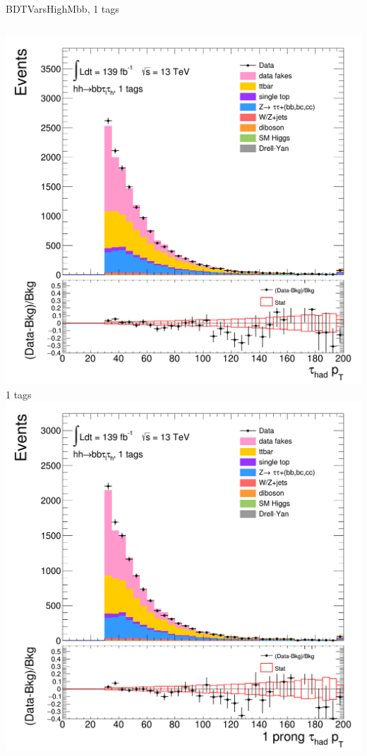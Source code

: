 \begin{frame}{BDTVarsHighMbb, 1 tags}
  \begin{columns}[c]
    \centering\includegraphics[width=\textwidth]{C_1tag2pjet_0ptv_TauPt}\\
    1 tags
    \centering\includegraphics[width=\textwidth]{C_1tag2pjet_0ptv_TauPt1P}\\

\end{columns}
\end{frame}
